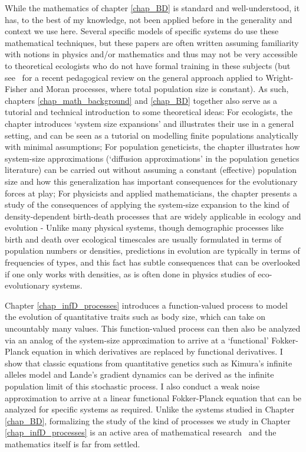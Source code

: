 While the mathematics of chapter \ref{chap_BD} is standard and well-understood, it has, to the best of my knowledge, not been applied before in the generality and context we use here. Several specific models of specific systems do use these mathematical techniques, but these papers are often written assuming familiarity with notions in physics and/or mathematics and thus may not be very accessible to theoretical ecologists who do not have formal training in these subjects (but see~\cite{czuppon_understanding_2021} for a recent pedagogical review on the general approach applied to Wright-Fisher and Moran processes, where total population size is constant). As such, chapters \ref{chap_math_background} and \ref{chap_BD} together also serve as a tutorial and technical introduction to some theoretical ideas: For ecologists, the chapter introduces `system size expansions' and illustrates their use in a general setting, and can be seen as a tutorial on modelling finite populations analytically with minimal assumptions; For population geneticists, the chapter illustrates how system-size approximations (`diffusion approximations' in the population genetics literature) can be carried out without assuming a constant (effective) population size and how this generalization has important consequences for the evolutionary forces at play; For physicists and applied mathematicians, the chapter presents a study of the consequences of applying the system-size expansion to the kind of density-dependent birth-death processes that are widely applicable in ecology and evolution - Unlike many physical systems, though demographic processes like birth and death over ecological timescales are usually formulated in terms of population numbers or densities, predictions in evolution are typically in terms of frequencies of types, and this fact has subtle consequences that can be overlooked if one only works with densities, as is often done in physics studies of eco-evolutionary systems.

Chapter \ref{chap_infD_processes} introduces a function-valued process to model the evolution of quantitative traits such as body size, which can take on uncountably many values. This function-valued process can then also be analyzed via an analog of the system-size approximation to arrive at a `functional' Fokker-Planck equation in which derivatives are replaced by functional derivatives. I show that classic equations from quantitative genetics such as Kimura's infinite alleles model and Lande's gradient dynamics can be derived as the infinite population limit of this stochastic process. I also conduct a weak noise approximation to arrive at a linear functional Fokker-Planck equation that can be analyzed for specific systems as required. Unlike the systems studied in Chapter \ref{chap_BD}, formalizing the study of the kind of processes we study in Chapter \ref{chap_infD_processes} is an active area of mathematical research~\citep{carmona_stochastic_1999,da_prato_stochastic_2014,prevot_concise_2007,liu_stochastic_2015,bogachev_fokker-planck-kolmogorov_2015,balan_gentle_2018} and the mathematics itself is far from settled.

